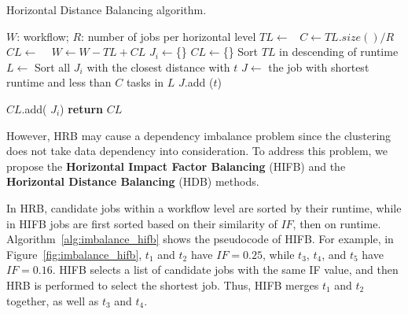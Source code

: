 \documentclass[final,5p,times,twocolumn]{elsarticle}
\begin{document}
\begin{algorithm}[!htb]
	\footnotesize
	\caption{Horizontal Distance Balancing algorithm.}
	\label{alg:imbalance_hdb}
	\begin{algorithmic}[1]
		\Require $W$: workflow; $R$: number of jobs per horizontal level
				\State $TL\gets $\  
				\State $C \gets TL.size() / R$ 
				\State $CL\gets$  \  
				\State $W \gets W - TL + CL$   
			\EndFor
		\EndProcedure
			\State $J_i\gets$\{\}
			\EndFor
			\State $CL\gets$\{\}
			\State Sort $TL$ in descending of runtime
				\State $L\gets$ Sort all $J_i$ with the closest distance with $t$
				\State $J\gets$ the job with shortest runtime and less than $C$ tasks in $L$
				\State $J$.add ($t$) 
				
			\EndFor
			\State  $CL$.add( $J_i$)
			\EndFor
			\State \textbf{return} $CL$
		\EndProcedure
	\end{algorithmic}
\end{algorithm}





However, HRB may cause a dependency imbalance problem since the clustering does not take data dependency into consideration. To address this problem, we propose the \textbf{Horizontal Impact Factor Balancing} (HIFB) and the \textbf{Horizontal Distance Balancing} (HDB) methods. 

In HRB, candidate jobs within a workflow level are sorted by their runtime, while in HIFB jobs are first sorted based on their similarity of $IF$, then on runtime. 
Algorithm~\ref{alg:imbalance_hifb} shows the pseudocode of HIFB. 
For example, in Figure~\ref{fig:imbalance_hifb}, $t_1$ and $t_2$ have $IF = 0.25$, while $t_3$, $t_4$, and $t_5$ have $IF = 0.16$. HIFB selects a list of candidate jobs with the same IF value, and then HRB is performed to select the shortest job. Thus, HIFB merges $t_1$ and $t_2$ together, as well as $t_3$ and $t_4$.
\end{document}
